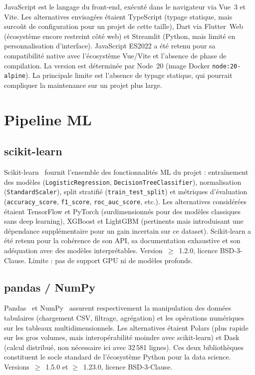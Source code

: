 \documentclass[12pt,a4paper,openany]{report}
\begin{document}
JavaScript est le langage du front-end, exécuté dans le navigateur via Vue~3 et Vite. Les alternatives envisagées étaient TypeScript (typage statique, mais surcoût de configuration pour un projet de cette taille), Dart via Flutter~Web (écosystème encore restreint côté web) et Streamlit (Python, mais limité en personnalisation d'interface). JavaScript ES2022 a été retenu pour sa compatibilité native avec l'écosystème Vue/Vite et l'absence de phase de compilation. La version est déterminée par Node~20 (image Docker \texttt{node:20-alpine}). La principale limite est l'absence de typage statique, qui pourrait compliquer la maintenance sur un projet plus large.

\section{Pipeline ML}

\subsection{scikit-learn}
Scikit-learn~\cite{scikit-learn} fournit l'ensemble des fonctionnalités ML du projet : entraînement des modèles (\texttt{LogisticRegression}, \texttt{DecisionTreeClassifier}), normalisation (\texttt{StandardScaler}), split stratifié (\texttt{train\_test\_split}) et métriques d'évaluation (\texttt{accuracy\_score}, \texttt{f1\_score}, \texttt{roc\_auc\_score}, etc.). Les alternatives considérées étaient TensorFlow et PyTorch (surdimensionnés pour des modèles classiques sans deep learning), XGBoost et LightGBM (pertinents mais introduisant une dépendance supplémentaire pour un gain incertain sur ce dataset). Scikit-learn a été retenu pour la cohérence de son API, sa documentation exhaustive et son adéquation avec des modèles interprétables. Version~$\geq$~1.2.0, licence BSD-3-Clause. Limite : pas de support GPU ni de modèles profonds.

\subsection{pandas / NumPy}

Pandas~\cite{pandas} et NumPy~\cite{numpy} assurent respectivement la manipulation des données tabulaires (chargement CSV, filtrage, agrégation) et les opérations numériques sur les tableaux multidimensionnels. Les alternatives étaient Polars (plus rapide sur les gros volumes, mais interopérabilité moindre avec scikit-learn) et Dask (calcul distribué, non nécessaire ici avec 32\,581 lignes). Ces deux bibliothèques constituent le socle standard de l'écosystème Python pour la data science. Versions~$\geq$~1.5.0 et $\geq$~1.23.0, licence BSD-3-Clause.
\end{document}
